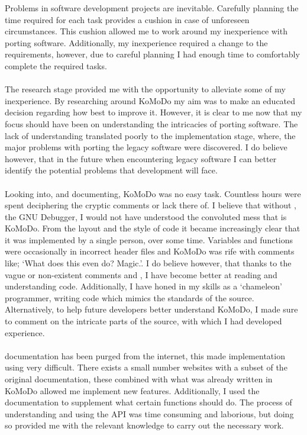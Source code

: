 Problems in software development projects are inevitable. Carefully planning the time required for each task provides a cushion in case of unforeseen circumstances. This cushion allowed me to work around my inexperience with porting software. Additionally, my inexperience required a change to the requirements, however, due to careful planning I had enough time to comfortably complete the required tasks.\\\\
%
The research stage provided me with the opportunity to alleviate some of my inexperience. By researching around KoMoDo my aim was to make an educated decision regarding how best to improve it. However, it is clear to me now that my focus should have been on understanding the intricacies of porting software. The lack of understanding translated poorly to the implementation stage, where, the major problems with porting the legacy software were discovered. I do believe however, that in the future when encountering legacy software I can better identify the potential problems that development will face.\\\\
%
Looking into, and documenting, KoMoDo was no easy task. Countless hours were spent deciphering the cryptic comments or lack there of. I believe that without , the GNU Debugger, I would not have understood the convoluted mess that is KoMoDo. From the layout and the style of code it became increasingly clear that it was implemented by a single person, over some time. Variables and functions were occasionally in incorrect header files and KoMoDo was rife with comments like; `What does this even do? Magic.'. I do believe however, that thanks to the vague or non-existent comments and , I have become better at reading and understanding code. Additionally, I have honed in my skills as a `chameleon' programmer, writing code which mimics the standards of the source. Alternatively, to help future developers better understand KoMoDo, I made sure to comment on the intricate parts of the source, with which I had developed experience.\\\\
%
 documentation has been purged from the internet, this made implementation using  very difficult. There exists a small number websites with a subset of the original documentation, these combined with what was already written in KoMoDo allowed me implement new features. Additionally, I used the  documentation to supplement what certain functions should do. The process of understanding and using the  API was time consuming and laborious, but doing so provided me with the relevant knowledge to carry out the necessary work.\\\\
